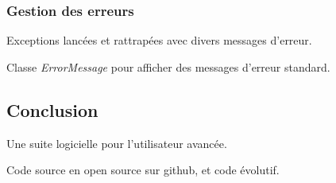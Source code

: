 \documentclass{beamer}
\begin{document}
\begin{frame}
	\frametitle{Gestion des erreurs}
	
	Exceptions lancées et rattrapées avec divers messages d'erreur.

	Classe \emph{ErrorMessage} pour afficher des messages d'erreur standard.
\end{frame}

\subsection{Conclusion}

\begin{frame}
	Une suite logicielle pour l'utilisateur avancée.

	Code source en open source sur github, et code évolutif.
\end{frame}
\end{document}
